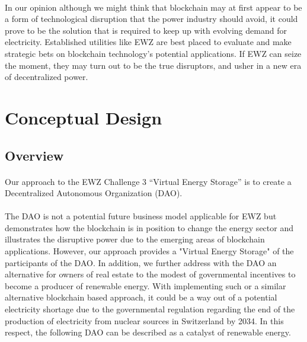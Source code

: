 \documentclass{scrartcl}
\begin{document}
    \paragraph{}
    In our opinion although we might think that blockchain may at first appear to be a form of technological disruption that the power industry should avoid, it could prove to be the solution that is required to keep up with evolving demand for electricity. Established utilities like EWZ are best placed to evaluate and make strategic bets on blockchain technology’s potential applications. If EWZ can seize the moment, they may turn out to be the true disruptors, and usher in a new era of decentralized power.
	
	\section{Conceptual Design}
	
	\subsection{Overview}

    \paragraph{}
    Our approach to the EWZ Challenge 3 “Virtual Energy Storage” is to create a Decentralized Autonomous Organization (DAO). 
    
    \paragraph{}
    The DAO is not a potential future business model applicable for EWZ but demonstrates how the blockchain is in position to change the energy sector and illustrates the disruptive power due to the emerging areas of blockchain applications. However, our approach provides a "Virtual Energy Storage" of the participants of the DAO. In addition, we further address with the DAO an alternative for owners of real estate to the modest of governmental incentives to become a producer of renewable energy. With implementing such or a similar alternative blockchain based approach, it could be a way out of a potential electricity shortage due to the governmental regulation regarding the end of the production of electricity from nuclear sources in Switzerland by 2034. In this respect, the following DAO can be described as a catalyst of renewable energy. 
    
\end{document}
